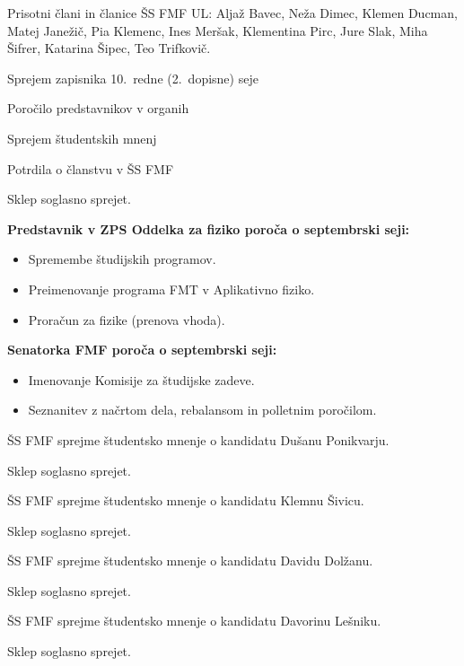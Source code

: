 \documentclass{seja}
\begin{document}
Prisotni člani in članice ŠS FMF UL:
Aljaž Bavec,
Neža Dimec,
Klemen Ducman,
Matej Janežič,
Pia Klemenc,
Ines Meršak,
Klementina Pirc,
Jure Slak,
Miha Šifrer,
Katarina Šipec,
Teo Trifkovič.

\begin{red*}
  \item Sprejem zapisnika 10.~redne (2.~dopisne) seje
  \item Poročilo predstavnikov v organih 
  \item Sprejem študentskih mnenj
  \item Potrdila o članstvu v ŠS FMF
\end{red*}

\begin{ad}
	\item 
	
	Sklep soglasno sprejet.

    \item
    \textbf{Predstavnik v ZPS Oddelka za fiziko poroča o septembrski seji:}
    \begin{itemize}
        \item Spremembe študijskih programov.
        \item Preimenovanje programa FMT v Aplikativno fiziko.
        \item Proračun za fizike (prenova vhoda).
    \end{itemize}
    
    \textbf{Senatorka FMF poroča o septembrski seji:}
    \begin{itemize}
        \item Imenovanje Komisije za študijske zadeve.
        \item Seznanitev z načrtom dela, rebalansom in polletnim poročilom.
    \end{itemize}
    
	\item
	\begin{sklep}
		ŠS FMF sprejme študentsko mnenje o kandidatu Dušanu Ponikvarju.
	\end{sklep}
	Sklep soglasno sprejet.
	\begin{sklep}
		ŠS FMF sprejme študentsko mnenje o kandidatu Klemnu Šivicu.
	\end{sklep}
	Sklep soglasno sprejet.
	\begin{sklep}
		ŠS FMF sprejme študentsko mnenje o kandidatu Davidu Dolžanu.
	\end{sklep}
	Sklep soglasno sprejet.
	\begin{sklep}
		ŠS FMF sprejme študentsko mnenje o kandidatu Davorinu Lešniku.
	\end{sklep}
	Sklep soglasno sprejet.
	

\end{ad}
\end{document}
